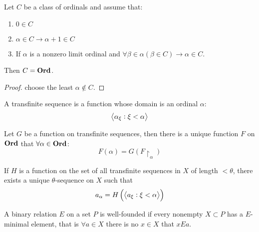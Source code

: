 \begin{theorem}
    Let $C$ be a class of ordinals and assume that:
    \begin{enumerate}
        \item $0 \in C$
        \item $\alpha \in C \rightarrow \alpha + 1 \in C$
        \item If $\alpha$ is a nonzero limit ordinal and $\forall \beta \in \alpha (\beta \in C) \rightarrow \alpha \in C$.
    \end{enumerate}
    Then $C = \mathbf{Ord}$.
\end{theorem}
\begin{proof}
    choose the least $\alpha \notin C$.
\end{proof}






\begin{definition}
    A transfinite sequence is a function whose domain is an ordinal $\alpha$:
    \begin{equation}
        \left< \alpha_\xi : \xi < \alpha \right>
    \end{equation}
\end{definition}

\begin{theorem}
    Let $G$ be a function on transfinite sequences, then there is a unique function $F$ on $\mathbf{Ord}$ that $\forall \alpha \in \mathbf{Ord}$:
    \begin{equation}
        F(\alpha) = G(F\restriction_\alpha)
    \end{equation}
    
    If $H$ is a function on the set of all transfinite sequences in $X$ of length $< \theta$, there exists a unique $\theta$-sequence on $X$ such that 
    \begin{equation}
        a_\alpha = H\left(\left< a_\xi : \xi < \alpha \right> \right)
    \end{equation}
\end{theorem}


\begin{definition}
    A binary relation $E$ on a set $P$ is well-founded if every nonempty $X \subset P$ has a $E$-minimal element, that is $\forall a \in X$ there is no $x \in X$ that $x E a$.
\end{definition}

